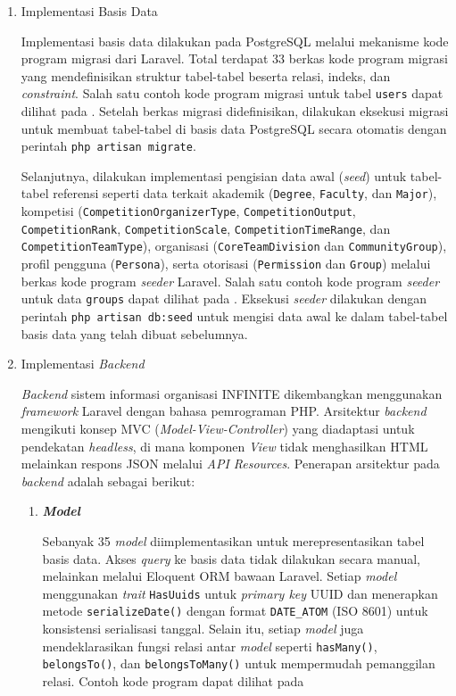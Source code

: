 \begin{enumerate}[listparindent=1cm]
      \item Implementasi Basis Data

            Implementasi basis data dilakukan pada PostgreSQL melalui mekanisme kode program migrasi dari Laravel. Total terdapat 33 berkas kode program migrasi yang mendefinisikan struktur tabel-tabel beserta relasi, indeks, dan \textit{constraint}. Salah satu contoh kode program migrasi untuk tabel \texttt{users} dapat dilihat pada . Setelah berkas migrasi didefinisikan, dilakukan eksekusi migrasi untuk membuat tabel-tabel di basis data PostgreSQL secara otomatis dengan perintah \texttt{php artisan migrate}.

            Selanjutnya, dilakukan implementasi pengisian data awal (\textit{seed}) untuk tabel-tabel referensi seperti data terkait akademik (\texttt{Degree}, \texttt{Faculty}, dan \texttt{Major}), kompetisi (\texttt{CompetitionOrganizerType}, \texttt{CompetitionOutput}, \texttt{CompetitionRank}, \texttt{CompetitionScale}, \texttt{CompetitionTimeRange}, dan \texttt{CompetitionTeamType}), organisasi (\texttt{CoreTeamDivision} dan \texttt{CommunityGroup}), profil pengguna (\texttt{Persona}), serta otorisasi (\texttt{Permission} dan \texttt{Group}) melalui berkas kode program \textit{seeder} Laravel. Salah satu contoh kode program \textit{seeder} untuk data \texttt{groups} dapat dilihat pada . Eksekusi \textit{seeder} dilakukan dengan perintah \texttt{php artisan db:seed} untuk mengisi data awal ke dalam tabel-tabel basis data yang telah dibuat sebelumnya.

      \item Implementasi \textit{Backend}

            \textit{Backend} sistem informasi organisasi INFINITE dikembangkan menggunakan \textit{framework} Laravel dengan bahasa pemrograman PHP. Arsitektur \textit{backend} mengikuti konsep MVC (\textit{Model-View-Controller}) yang diadaptasi untuk pendekatan \textit{headless}, di mana komponen \textit{View} tidak menghasilkan HTML melainkan respons JSON melalui \textit{API Resources}. Penerapan arsitektur pada \textit{backend} adalah sebagai berikut:

            \begin{enumerate}[listparindent=1cm, label=\alph*.]
                  \item \textbf{\textit{Model}}

                        Sebanyak 35 \textit{model} diimplementasikan untuk merepresentasikan tabel basis data. Akses \textit{query} ke basis data tidak dilakukan secara manual, melainkan melalui Eloquent ORM bawaan Laravel. Setiap \textit{model} menggunakan \textit{trait} \texttt{HasUuids} untuk \textit{primary key} UUID dan menerapkan metode \texttt{serializeDate()} dengan format \texttt{DATE\_ATOM} (ISO 8601) untuk konsistensi serialisasi tanggal. Selain itu, setiap \textit{model} juga mendeklarasikan fungsi relasi antar \textit{model} seperti \texttt{hasMany()}, \texttt{belongsTo()}, dan \texttt{belongsToMany()} untuk mempermudah pemanggilan relasi. Contoh kode program dapat dilihat pada 


\end{enumerate}
\end{enumerate}
